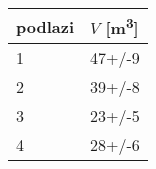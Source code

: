 \begin{tabular}{ll}
\toprule
podlazi & $V$ [\si{m^3}] \\
\midrule
1 &         47+/-9 \\
2 &         39+/-8 \\
3 &         23+/-5 \\
4 &         28+/-6 \\
\bottomrule
\end{tabular}
